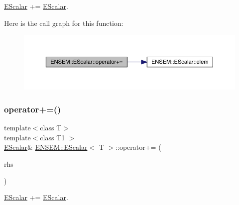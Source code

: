 \mbox{\hyperlink{classENSEM_1_1EScalar}{E\+Scalar}} += \mbox{\hyperlink{classENSEM_1_1EScalar}{E\+Scalar}}. 

Here is the call graph for this function\+:
\nopagebreak
\begin{figure}[H]
\begin{center}
\leavevmode
\includegraphics[width=350pt]{d0/d82/classENSEM_1_1EScalar_aa34f8bd686adb144a6d0e5e8f69787ce_cgraph}
\end{center}
\end{figure}
\mbox{\label{classENSEM_1_1EScalar_aa34f8bd686adb144a6d0e5e8f69787ce}} 
\subsubsection{\texorpdfstring{operator+=()}{operator+=()}\hspace{0.1cm}{\footnotesize\ttfamily [2/2]}}
{\footnotesize\ttfamily template$<$class T$>$ \\
template$<$class T1 $>$ \\
\mbox{\hyperlink{classENSEM_1_1EScalar}{E\+Scalar}}\& \mbox{\hyperlink{classENSEM_1_1EScalar}{E\+N\+S\+E\+M\+::\+E\+Scalar}}$<$ T $>$\+::operator+= (\begin{DoxyParamCaption}\item[{const \mbox{\hyperlink{classENSEM_1_1EScalar}{E\+Scalar}}$<$ T1 $>$ \&}]{rhs }\end{DoxyParamCaption})\hspace{0.3cm}{\ttfamily [inline]}}



\mbox{\hyperlink{classENSEM_1_1EScalar}{E\+Scalar}} += \mbox{\hyperlink{classENSEM_1_1EScalar}{E\+Scalar}}. 

